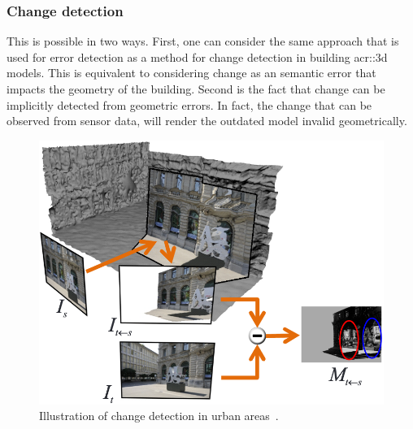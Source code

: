         \subsubsection{Change detection}
            This is possible in two ways.
            First, one can consider the same approach that is used for error detection as a method for change detection in building \gls{acr::3d} models.
            This is equivalent to considering change as an semantic error that impacts the geometry of the building.
            Second is the fact that change can be implicitly detected from geometric errors.
            In fact, the change that can be observed from sensor data, will render the outdated model invalid geometrically.
            \begin{figure}[H]
                \centering
                \includegraphics[width=\textwidth]{images/introduction/use/change_detection_taneja}
                \caption{\label{fig::3d_change_detection} Illustration of change detection in urban areas~\parencite{taneja2013city}.}
            \end{figure}

